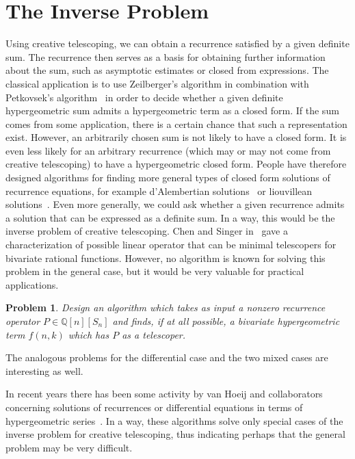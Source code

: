\documentclass[a4paper,draft]{amsart}
\let\set\mathbb
\newtheorem{problem}{Problem}
\begin{document}
 \section{The Inverse Problem}

 Using creative telescoping, we can obtain a recurrence satisfied by a given
 definite sum. The recurrence then serves as a basis for obtaining further
 information about the sum, such as asymptotic estimates or closed from
 expressions. The classical application is to use Zeilberger's algorithm in
 combination with Petkovsek's algorithm~\cite{petkovsek92,petkovsek97} in order
 to decide whether a given definite hypergeometric sum admits a hypergeometric
 term as a closed form. If the sum comes from some application, there is a
 certain chance that such a representation exist. However, an arbitrarily chosen
 sum is not likely to have a closed form.  It is even less likely for an
 arbitrary recurrence (which may or may not come from creative telescoping) to
 have a hypergeometric closed form. People have therefore designed algorithms
 for finding more general types of closed form solutions of recurrence
 equations, for example d'Alembertian solutions~\cite{abramov94,petkovsek97} or
 liouvillean solutions~\cite{put97,hendriks98}. Even more generally, we could
 ask whether a given recurrence admits a solution that can be expressed as a
 definite sum. In a way, this would be the inverse problem of creative
 telescoping. Chen and Singer in~\cite{chen12d} gave a characterization of possible linear operator that can be
 minimal telescopers for bivariate rational functions. However, no algorithm is known for solving this problem in the general case,
 but it would be very valuable for practical applications.

 \begin{problem}
   Design an algorithm which takes as input a nonzero recurrence operator $P\in\set Q[n][S_n]$
   and finds, if at all possible, a bivariate hypergeometric term $f(n,k)$ which has $P$
   as a telescoper.
 \end{problem}

 The analogous problems for the differential case and the two mixed cases are interesting as well.

 In recent years there has been some activity by van Hoeij and
 collaborators concerning solutions of recurrences or differential equations in
 terms of hypergeometric
 series~\cite{hoeij10,cha10,cha10a,kunwar13,imamoglu15}. In a way, these
 algorithms solve only special cases of the inverse problem for creative
 telescoping, thus indicating perhaps that the general problem may be very
 difficult.
\end{document}

